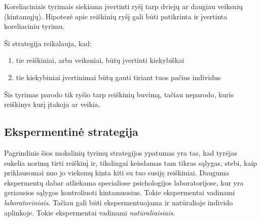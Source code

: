Koreliaciniais tyrimais siekiama įvertinti ryšį tarp dviejų ar daugiau 
veiksnių (kintamųjų). Hipotezė apie reiškinių ryšį gali būti patikrinta ir 
įvertinta koreliaciniu tyrimu. 

Ši strategija reikalauja, kad: 
\begin{enumerate}
  \item tie reiškiniai, arba veiksniai, būtų įvertinti kiekybiškai
  \item tie kiekybiniai įvertinimai būtų gauti tiriant tuos pačius individus
\end{enumerate}

Šis tyrimas parodo tik ryšio tarp reiškinių buvimą, tačiau neparodo, kuris
reiškinys kurį įtakoja ar veikia. 

\subsection{Ekspermentinė strategija}

Pagrindinis šios mokslinių tyrimų strategijos ypatumas yra tas, kad tyrėjas 
sukelia norimą tirti reiškinį ir, tikslingai keisdamas tam tikras sąlygas, 
stebi, kaip priklausomai nuo jo vieksmų kinta kiti su tuo susiję reiškiniai.
Dauguma ekspermentų dabar atliekama specialiose psichologijos laboratorijose,
kur yra geriausios sąlygos kontroliuoti kintamuosius. Tokie ekspermentai 
vadinami \emph{laboratoriniais}. Tačiau gali būti ekspermentuojama ir 
natūralioje individo aplinkoje. Tokie ekspermentai vadinami 
\emph{natūraliaisiais}.
